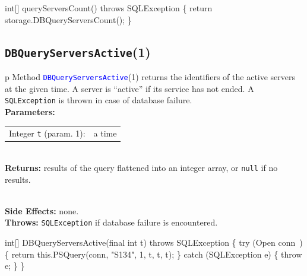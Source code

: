 \nwenddocs{}\endmoddef{}
int[] queryServersCount() throws SQLException \{
  return storage.DBQueryServersCount();
\}
\eatline
{}\nwendcode{}\nwdocspar
\subsection{\texttt{DBQueryServersActive}(1)}
\begin{tabular}{p{\textwidth}}
\toprule
{}
Method \textcolor{blue}{{\tt{}\protect{}DBQueryServersActive}}(1) returns the identifiers
of the active servers at the given time. A server is ``active'' if its
service has not ended.
A {\tt{}SQLException} is thrown in case of database failure.\\
\midrule
\textbf{Parameters:} \\
\begin{tabular}{lp{116mm}}
Integer {\tt{}t} (param. 1):&a time
\end{tabular}\\
\textbf{Returns:} results of the query flattened into an integer array, or
{\tt{}null} if no results.

\\
\textbf{Side Effects:} none.\\
\textbf{Throws:} {\tt{}SQLException} if database failure is encountered.\\
\bottomrule
\end{tabular}
\nwenddocs{}\endmoddef{}
int[] DBQueryServersActive(final int t) throws SQLException \{
  try (\LA{}Open \code{}conn\edoc{}~{\nwtagstyle{}}\RA{}) \{
    return this.PSQuery(conn, "S134", 1, t, t, t);
  \} catch (SQLException e) \{
    throw e;
  \}
\}
\eatline
{}\nwendcode{}

